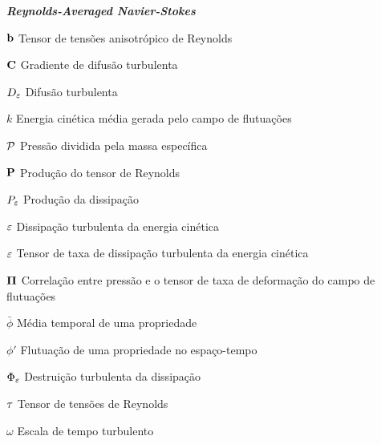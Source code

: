 \begin{simbolos}
    \item[\textbf{\textit{Reynolds-Averaged Navier-Stokes}}]
    \item[$\mathbf{b}$] Tensor de tensões anisotrópico de Reynolds
    \item[$\mathbf{C}$] Gradiente de difusão turbulenta
    \item[$D_\varepsilon$] Difusão turbulenta
    \item[$k$] Energia cinética média gerada pelo campo de flutuações
    \item[$\mathcal{P}$] Pressão dividida pela massa específica
    \item[$\mathbf{P}$] Produção do tensor de Reynolds
    \item[$P_\varepsilon$] Produção da dissipação
    \item[$\varepsilon$] Dissipação turbulenta da energia cinética
    \item[$\mathbf{\varepsilon}$] Tensor de taxa de dissipação turbulenta da energia cinética
    \item[$\mathbf{\Pi}$] Correlação entre pressão e o tensor de taxa de deformação do campo de flutuações
    \item[$\bar{\phi}$] Média temporal de uma propriedade
    \item[$\phi'$] Flutuação de uma propriedade no espaço-tempo
    \item[$\Phi_\varepsilon$] Destruição turbulenta da dissipação
    \item[$\mathbf{\tau}$] Tensor de tensões de Reynolds
    \item[$\omega$] Escala de tempo turbulento
\end{simbolos}